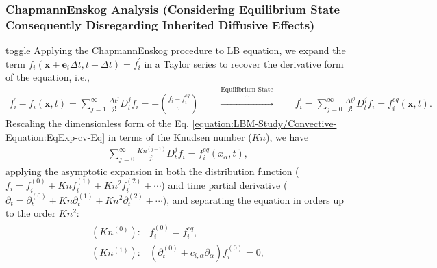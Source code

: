 \documentclass[letterpaper,10pt,english,openany,oneside]{jupyterBook}
\begin{document}
\subsubsection{Chapmann\sphinxhyphen{}Enskog Analysis (Considering Equilibrium State \sphinxhyphen{} Consequently Disregarding Inherited Diffusive Effects)}
\label{\detokenize{LBM-Study/Convective-Equation:chapmann-enskog-analysis-considering-equilibrium-state-consequently-disregarding-inherited-diffusive-effects}}
\begin{sphinxuseclass}{toggle}
\sphinxAtStartPar
Applying the Chapmann\sphinxhyphen{}Enskog procedure to LB equation, we expand the term \(f_{i}\left(\boldsymbol{x}+\boldsymbol{e}_i \Delta t, t+\Delta t\right)=f_{i}^{'}\) in a Taylor series to recover the derivative form of the equation, i.e.,
\begin{equation}\label{equation:LBM-Study/Convective-Equation:EqExp-cv-Eq}
\begin{split}
f_{i}^{'} - f_{i}(\boldsymbol{x}, t)=\displaystyle\sum_{j=1}^{\infty}\frac{\Delta t^{j}}{j!}D_{t}^{j}f_{i}= -\left( \frac{ f_{i} - f_{i}^{eq} }{ \tau } \right) \quad \quad \overbrace{\rightarrow}^{\textrm{Equilibrium State}} \quad \quad f_{i}^{'} = \displaystyle\sum_{j=0}^{\infty}\frac{\Delta t^{j}}{j!}D_{t}^{j}f_{i}= f_{i}^{eq}(\boldsymbol{x}, t).
\end{split}
\end{equation}
\sphinxAtStartPar
Rescaling the dimensionless form of the Eq. \eqref{equation:LBM-Study/Convective-Equation:EqExp-cv-Eq} in terms of the Knudsen number (\(Kn\)), we have
\begin{equation*}
\begin{split}
\displaystyle \sum^{\infty}_{j=0}  \frac{Kn^{(j-1)}}{j!} D_{t}^{j} f_{i} = f_{i}^{eq}(x_{\alpha}, t),
\end{split}
\end{equation*}
\sphinxAtStartPar
applying the asymptotic expansion in both the distribution function (\(f_{i}=f_{i}^{(0)}+Kn f_{i}^{(1)} + Kn^{2} f_{i}^{(2)}+\cdots\)) and time partial derivative (\(\partial_{t}=\partial_{t}^{(0)}+ Kn \partial_{t}^{(1)}+Kn^{2} \partial_{t}^{(2)}+\cdots\)), and separating the equation in orders up to the order \(Kn^{2}\):
\begin{equation}\label{equation:LBM-Study/Convective-Equation:Chap-Kn-cv-Eq}
\begin{split}
\begin{array}{ll}
    (Kn^{(0)}):& f_{i}^{(0)}= f_{i}^{eq},\\
    (Kn^{(1)}):& \left( \partial_{t}^{(0)} + c_{i,\alpha}\partial_{\alpha} \right)f_{i}^{(0)}= 0, \\

\end{array}
\end{split}
\end{equation}
\end{sphinxuseclass}
\end{document}
